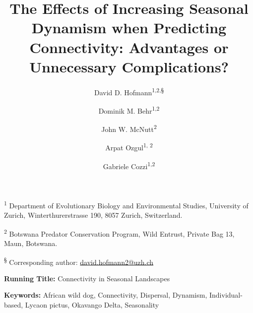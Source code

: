 \documentclass[abstract=on,10pt,a4paper,bibliography=totocnumbered]{article}
\title{The Effects of Increasing Seasonal Dynamism when Predicting Connectivity:
Advantages or Unnecessary Complications?}
\author{
  David D. Hofmann\textsuperscript{1,2,\S} \orcid{0000-0003-3477-4365} \and
  Dominik M. Behr\textsuperscript{1,2} \orcid{0000-0001-7378-8538} \and
  John W. McNutt\textsuperscript{2} \and
  Arpat Ozgul\textsuperscript{1, 2} \orcid{0000-0001-7477-2642} \and
  Gabriele Cozzi\textsuperscript{1,2} \orcid{0000-0002-1744-1940}
}
\begin{document}

\maketitle

\begin{flushleft}

\vspace{0.5cm}

\textsuperscript{1} Department of Evolutionary Biology and Environmental
Studies, University of Zurich, Winterthurerstrasse 190, 8057 Zurich,
Switzerland.

\textsuperscript{2} Botswana Predator Conservation Program, Wild Entrust,
Private Bag 13, Maun, Botswana.

\textsuperscript{\S} Corresponding author: \href{mailto://david.hofmann2@uzh.ch}{david.hofmann2@uzh.ch}

\vspace{4cm}

\textbf{Running Title:} Connectivity in Seasonal Landscapes

\vspace{0.5cm}

\textbf{Keywords:} African wild dog, Connectivity, Dispersal, Dynamism,
Individual-based, Lycaon pictus, Okavango Delta, Seasonality

\end{flushleft}
\end{document}

